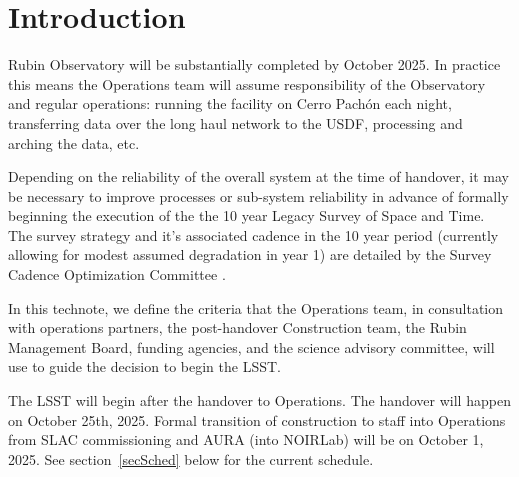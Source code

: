 \section{Introduction}

Rubin Observatory will be substantially completed by October 2025. In practice this means the Operations team \cite[see][]{RDO-018} will assume responsibility of the Observatory and regular operations: running the facility on Cerro Pach\'{o}n each night, transferring data over the long haul network to the USDF, processing and arching the data, etc. 

Depending on the reliability of the overall system at the time of handover, it may be necessary to improve processes or sub-system reliability in advance of formally beginning the execution of the the 10 year Legacy Survey of Space and Time. The survey strategy and it's associated cadence in the 10 year period (currently allowing for modest assumed degradation in year 1) are detailed by the Survey Cadence Optimization Committee \cite[SCOC,][]{PSTN-056}. 

In this technote, we define the criteria that the Operations team, in consultation with operations partners, the post-handover Construction team, the Rubin Management Board, funding agencies, and the science advisory committee, will use to guide the decision to begin the LSST. 

The LSST will begin after the handover to Operations. The handover will happen on October 25th, 2025. Formal transition of construction to staff into Operations from SLAC commissioning and AURA (into NOIRLab) will be on October 1, 2025. See section~\ref{secSched} below for the current schedule.  